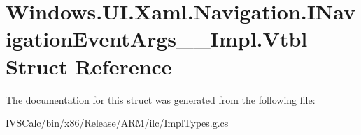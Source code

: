\hypertarget{struct_windows_1_1_u_i_1_1_xaml_1_1_navigation_1_1_i_navigation_event_args_____impl_1_1_vtbl}{}\section{Windows.\+U\+I.\+Xaml.\+Navigation.\+I\+Navigation\+Event\+Args\+\_\+\+\_\+\+Impl.\+Vtbl Struct Reference}
\label{struct_windows_1_1_u_i_1_1_xaml_1_1_navigation_1_1_i_navigation_event_args_____impl_1_1_vtbl}


The documentation for this struct was generated from the following file\+:\begin{DoxyCompactItemize}
\item 
I\+V\+S\+Calc/bin/x86/\+Release/\+A\+R\+M/ilc/Impl\+Types.\+g.\+cs\end{DoxyCompactItemize}
